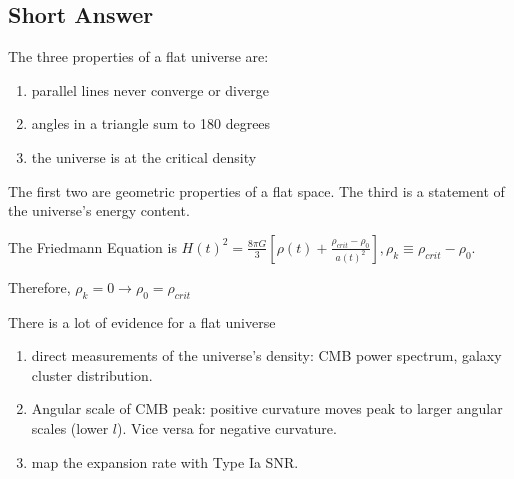 \documentclass[\main/main.tex]{subfiles}
\begin{document}
	\subsection{Short Answer} %
	\label{sub:short_answer}

	The three properties of a flat universe are:

	\begin{enumerate}
		\item parallel lines never converge or diverge
		\item angles in a triangle sum to 180 degrees
		\item the universe is at the critical density
	\end{enumerate}

	The first two are geometric properties of a flat space. The third is a statement of the universe's energy content.

	The Friedmann Equation is  ${H(t)}^2 = \frac{8 \pi G}{3} \left[ \rho(t) + \frac{\rho_{crit} -\rho_0}{{a(t)}^2} \right], \rho_k \equiv \rho_{crit} -\rho_0$.

	Therefore, $\rho_k = 0 \rightarrow \rho_0 = \rho_{crit}$

	There is a lot of evidence for a flat universe

	\begin{enumerate}
		\item direct measurements of the universe's density: CMB power spectrum, galaxy cluster distribution.
		\item Angular scale of CMB peak: positive curvature moves peak to larger angular scales (lower $l$). Vice versa for negative curvature.
		\item map the expansion rate with Type Ia SNR.
	\end{enumerate}	
	


	

	
\end{document}

